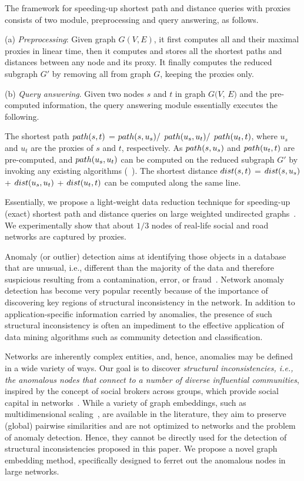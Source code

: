 The framework for speeding-up shortest path and distance queries with proxies consists of two module, preprocessing and query answering, as follows.


\ni(a) {\em Preprocessing}: Given graph $G(V, E)$, it first computes all \dras and their maximal proxies in linear time, then it computes and stores all the shortest paths and distances between any node and its proxy. It finally computes the reduced subgraph $G'$ by removing all \dras from graph $G$, \ie keeping the proxies only.


\ni(b) {\em Query answering}. Given two nodes $s$ and $t$ in graph $G(V$, $E)$  and the pre-computed information, the query answering module essentially executes the following.

The shortest path $\path(s, t)$ = $\path(s, u_s)/$ $\path(u_s, u_t)/$ $\path(u_t, t)$, where $u_s$ and $u_t$ are the proxies of $s$ and $t$, respectively.
As  $\path(s, u_s)$ and $\path(u_t, t)$ are pre-computed, and $\path(u_s, u_t)$ can be computed on the reduced subgraph $G'$ by invoking any existing algorithms
(\eg \ah~\cite{zhu2013shortest}).
%
The shortest distance $\dist(s, t)$ = $\dist(s, u_s)$ + $\dist(u_s, u_t)$ + $\dist(u_t, t)$ can be computed along the same line.

Essentially, we propose a light-weight data reduction technique for speeding-up (exact)  shortest path and distance queries on large weighted undirected graphs~\cite{MaFLWCH16}. We experimentally show that about $1/3$  nodes of real-life social and road networks  are captured by proxies.





Anomaly (or outlier) detection aims at identifying those objects in a database that are unusual, i.e., different than the majority of the data and therefore suspicious resulting from a contamination, error, or fraud~\cite{Zimek2017}. Network anomaly detection has become very popular
recently because of the importance of discovering key
regions of structural inconsistency in the network. In addition
to application-specific information carried by anomalies, the
presence of such structural inconsistency is often an impediment
to the effective application of data mining algorithms such as
community detection and classification.


Networks are inherently complex entities, and, hence, anomalies may be defined in a wide variety of ways.
Our goal is to discover {\em  structural inconsistencies, i.e.,  the anomalous nodes that connect to a number of diverse influential communities}, inspired by the concept of social brokers across groups, which provide social capital in networks~\cite{s-hole04}.
While a variety of graph embeddings, such as multidimensional scaling~\cite{mds}, are available in the literature, they aim to preserve (global) pairwise similarities and are not optimized to networks and the problem of anomaly detection.
Hence, they cannot be directly used for the detection of structural inconsistencies proposed in this paper. We propose a novel graph embedding method, specifically designed to ferret out the anomalous nodes in large networks.


